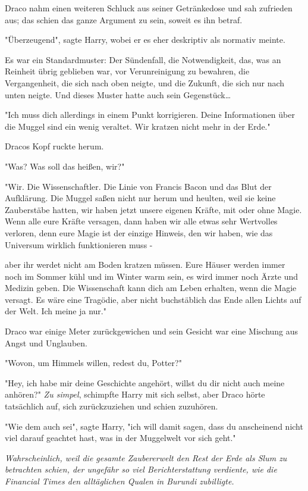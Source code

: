 {Draco nahm einen weiteren Schluck aus seiner Getränkedose und sah zufrieden aus; das schien das ganze Argument zu sein, soweit es ihn betraf.

"Überzeugend", sagte Harry, wobei er es eher deskriptiv als normativ meinte.

Es war ein Standardmuster: Der Sündenfall, die Notwendigkeit, das, was an Reinheit übrig geblieben war, vor Verunreinigung zu bewahren, die Vergangenheit, die sich nach oben neigte, und die Zukunft, die sich nur nach unten neigte. Und dieses Muster hatte auch sein Gegenstück…

"Ich muss dich allerdings in einem Punkt korrigieren. Deine Informationen über die Muggel sind ein wenig veraltet. Wir kratzen nicht mehr in der Erde."

Dracos Kopf ruckte herum.

"Was? Was soll das heißen, wir?"

"Wir. Die Wissenschaftler. Die Linie von Francis Bacon und das Blut der Aufklärung. Die Muggel saßen nicht nur herum und heulten, weil sie keine Zauberstäbe hatten, wir haben jetzt unsere eigenen Kräfte, mit oder ohne Magie. Wenn alle eure Kräfte versagen, dann haben wir alle etwas sehr Wertvolles verloren, denn eure Magie ist der einzige Hinweis, den wir haben, wie das Universum wirklich funktionieren muss -

aber ihr werdet nicht am Boden kratzen müssen. Eure Häuser werden immer noch im Sommer kühl und im Winter warm sein, es wird immer noch Ärzte und Medizin geben. Die Wissenschaft kann dich am Leben erhalten, wenn die Magie versagt. Es wäre eine Tragödie, aber nicht buchstäblich das Ende allen Lichts auf der Welt. Ich meine ja nur."

Draco war einige Meter zurückgewichen und sein Gesicht war eine Mischung aus Angst und Unglauben.

"Wovon, um Himmels willen, redest du, Potter?"

"Hey, ich habe mir deine Geschichte angehört, willst du dir nicht auch meine anhören?" \emph{Zu simpel}, schimpfte Harry mit sich selbst, aber Draco hörte tatsächlich auf, sich zurückzuziehen und schien zuzuhören.

"Wie dem auch sei", sagte Harry, "ich will damit sagen, dass du anscheinend nicht viel darauf geachtet hast, was in der Muggelwelt vor sich geht."

\emph{Wahrscheinlich, weil die gesamte Zaubererwelt den Rest der Erde als Slum zu betrachten schien, der ungefähr so viel Berichterstattung verdiente, wie die Financial Times den alltäglichen Qualen in Burundi zubilligte.}

}
